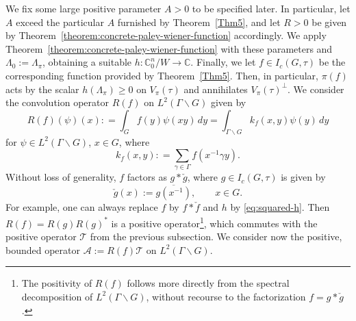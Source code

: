 \documentclass[11pt,oneside]{amsart}
\numberwithin{equation}{section}
\theoremstyle{remark}
\theoremstyle{plain}
\newcommand\CC{\mathbb{C}}
\newcommand{\mcA}{\mathcal{A}}
\newcommand{\mcT}{\mathcal{T}}
\newcommand\ov{\overline}
\newcommand\bs{\backslash}
\renewcommand\geq{\geqslant}
\begin{document}
We fix some large positive parameter $A>0$ to be specified later. In particular, let $A$ exceed the particular $A$ furnished by Theorem~\ref{Thm5}, and let $R>0$ be given by Theorem~\ref{theorem:concrete-paley-wiener-function} accordingly. We apply Theorem~\ref{theorem:concrete-paley-wiener-function} with these parameters and $\Lambda_0:=\Lambda_{\pi}$, obtaining a suitable $h:\CC^n_0/W\to\CC$. Finally, we let $f \in I_{c}(G,\tau)$ be the corresponding function provided by Theorem~\ref{Thm5}. Then, in particular, $\pi(f)$ acts by the scalar $h(\Lambda_{\pi})\geq 0$ on $V_{\pi}(\tau)$ and annihilates $V_{\pi}(\tau)^{\perp}$. We consider the convolution operator $R(f)$ on $L^2(\Gamma\bs G)$ given by
$$R(f)(\psi)(x): = \int_G f(y) \psi(xy)\, dy = \int_{\Gamma\bs G} k_f(x, y) \psi(y)\,dy$$
for $\psi \in L^2(\Gamma \bs G)$, $x \in G$, where
$$k_f(x, y): = \sum_{\gamma \in \Gamma} f(x^{-1} \gamma y).$$ 
Without loss of generality, $f$ factors as $g\ast\check g$, where $g\in I_c(G,\tau)$ is given by
\[\check g(x):=\ov{g(x^{-1})},\qquad x\in G.\]
For example, one can always replace $f$ by $f\ast\check f$ and $h$ by \eqref{eq:squared-h}. Then $R(f)=R(g)R(g)^\ast$ is a positive operator\footnote{The positivity of $R(f)$ follows more directly from the spectral decomposition of $L^2(\Gamma \bs G)$, without recourse to the factorization $f=g\ast\check g$.}, which commutes with the positive operator $\mcT$ from the previous subsection. We consider now the positive, bounded operator $\mcA := R(f) \mcT$ on $L^2(\Gamma \bs G)$. 
\end{document}
